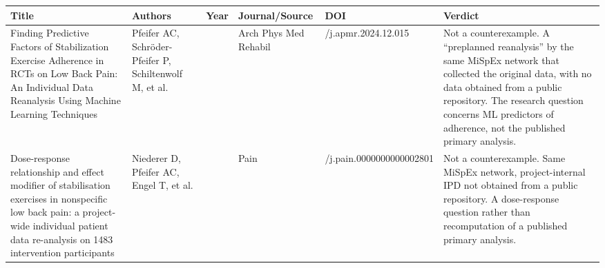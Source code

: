 {
\begin{longtable}[]{@{}
  >{\raggedright\arraybackslash}p{}
  >{\raggedright\arraybackslash}p{}
  >{\raggedright\arraybackslash}p{}
  >{\raggedright\arraybackslash}p{}
  >{\raggedright\arraybackslash}p{}
  >{\raggedright\arraybackslash}p{}@{}}
\toprule\noalign{}
\begin{minipage}[b]{\linewidth}\raggedright
Title
\end{minipage} & \begin{minipage}[b]{\linewidth}\raggedright
Authors
\end{minipage} & \begin{minipage}[b]{\linewidth}\raggedright
Year
\end{minipage} & \begin{minipage}[b]{\linewidth}\raggedright
Journal/Source
\end{minipage} & \begin{minipage}[b]{\linewidth}\raggedright
DOI
\end{minipage} & \begin{minipage}[b]{\linewidth}\raggedright
Verdict
\end{minipage} \\
\midrule\noalign{}
\endhead
\bottomrule\noalign{}
\endlastfoot
Finding Predictive Factors of Stabilization Exercise Adherence in RCTs on Low Back Pain: An Individual Data Reanalysis Using Machine Learning Techniques & Pfeifer AC, Schröder-Pfeifer P, Schiltenwolf M, et al. & 2025 & Arch Phys Med Rehabil & 10.1016/j.apmr.2024.12.015 & Not a counterexample. A ``preplanned reanalysis'' by the same MiSpEx network that collected the original data, with no data obtained from a public repository. The research question concerns ML predictors of adherence, not the published primary analysis. \\
Dose-response relationship and effect modifier of stabilisation exercises in nonspecific low back pain: a project-wide individual patient data re-analysis on 1483 intervention participants & Niederer D, Pfeifer AC, Engel T, et al. & 2023 & Pain & 10.1097/j.pain.0000000000002801 & Not a counterexample. Same MiSpEx network, project-internal IPD not obtained from a public repository. A dose-response question rather than recomputation of a published primary analysis. \\

\end{longtable}}
